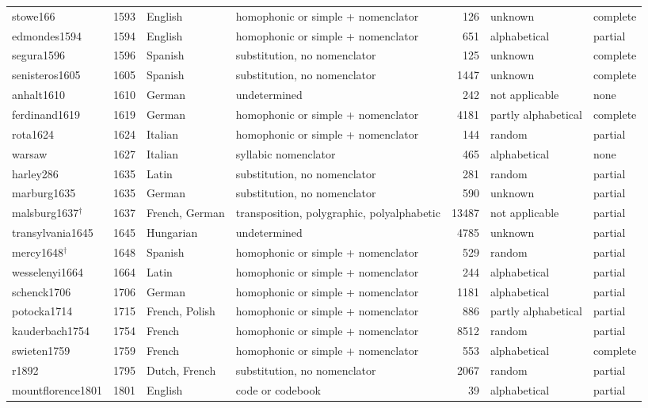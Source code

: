 \begin{table}[t]
{\begin{tabular}{@{}lrllrll@{}}
stowe166 & 1593 & English & homophonic or simple + nomenclator & 126 & unknown & complete \\
edmondes1594 & 1594 & English & homophonic or simple + nomenclator & 651 & alphabetical & partial \\
segura1596 & 1596 & Spanish & substitution, no nomenclator & 125 & unknown & complete \\
senisteros1605 & 1605 & Spanish & substitution, no nomenclator & 1447 & unknown & complete \\
anhalt1610 & 1610 & German & undetermined & 242 & not applicable & none \\
ferdinand1619 & 1619 & German & homophonic or simple + nomenclator & 4181 & partly alphabetical & complete \\
rota1624 & 1624 & Italian & homophonic or simple + nomenclator & 144 & random & partial \\
warsaw & 1627 & Italian & syllabic nomenclator & 465 & alphabetical & none \\
harley286 & 1635 & Latin & substitution, no nomenclator & 281 & random & partial \\
marburg1635 & 1635 & German & substitution, no nomenclator & 590 & unknown & partial \\
malsburg1637$^\dagger$ & 1637 & French, German & transposition, polygraphic, polyalphabetic & 13487 & not applicable & partial \\
transylvania1645 & 1645 & Hungarian & undetermined & 4785 & unknown & partial \\
mercy1648$^\dagger$ & 1648 & Spanish & homophonic or simple + nomenclator & 529 & random & partial \\
wesselenyi1664 & 1664 & Latin & homophonic or simple + nomenclator & 244 & alphabetical & partial \\
schenck1706 & 1706 & German & homophonic or simple + nomenclator & 1181 & alphabetical & partial \\
potocka1714 & 1715 & French, Polish & homophonic or simple + nomenclator & 886 & partly alphabetical & partial \\
kauderbach1754 & 1754 & French & homophonic or simple + nomenclator & 8512 & random & partial \\
swieten1759 & 1759 & French & homophonic or simple + nomenclator & 553 & alphabetical & complete \\
r1892 & 1795 & Dutch, French & substitution, no nomenclator & 2067 & random & partial \\
mountflorence1801 & 1801 & English & code or codebook & 39 & alphabetical & partial \\

\end{tabular}}
\end{table}

